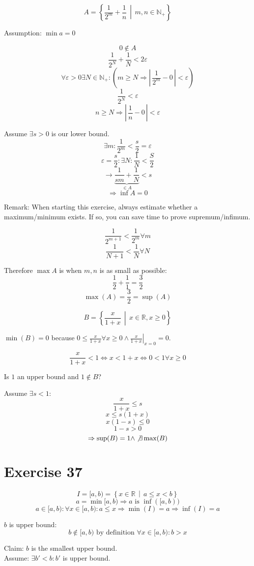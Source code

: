 \documentclass[a4paper]{article}
\theoremstyle{definition}
\newcommand\setdef[2]{\left\{#1\,\middle|\,#2\right\}}
\newcommand\card[1]{\left|\,#1\,\right|}
\begin{document}
\[ A = \setdef{\frac{1}{2^m} + \frac{1}{n}}{m,n \in \mathbb N_+} \]

Assumption: $\min{a} = 0$

\[ 0 \not\in A \]
\[ \frac{1}{2^N} + \frac{1}{N} < 2\varepsilon \]
\[ \forall \varepsilon > 0 \exists N \in \mathbb N_+: (m \geq N \Rightarrow \card{\frac{1}{2^m} - 0} < \varepsilon) \]
\[ \frac{1}{2^N} < \varepsilon \]
\[ n \geq N \Rightarrow \card{\frac1n - 0} < \varepsilon \]

Assume $\exists s > 0$ is our lower bound.
\[ \exists m: \frac{1}{2^m} < \frac{s}{2} = \varepsilon \]
\[ \varepsilon = \frac{s}{2}: \exists N: \frac{1}{N} < \frac{S}{2} \]
\[ \rightarrow \underbrace{\frac{1}{sm} + \frac{1}{N}}_{\in A} < s \]
\[ \Rightarrow \inf{A} = 0 \]

Remark: When starting this exercise, always estimate whether a maximum/minimum exists.
If so, you can save time to prove supremum/infimum.

\[ \frac{1}{2^{m+1}} < \frac{1}{2^m} \forall m \]
\[ \frac{1}{N+1} < \frac{1}{N} \forall N \]

Therefore $\max{A}$ is when $m,n$ is as small as possible:
\[ \frac12 + \frac11 = \frac32 \]
\[ \max(A) = \frac32 = \sup(A) \]

\[ B = \setdef{\frac{x}{1+x}}{x \in \mathbb R, x \geq 0} \]

$\min(B) = 0$ because $0 \leq \frac{x}{1 + x} \forall x \geq 0 \land \left.\frac{x}{1+x} \right|_{x = 0} = 0$.

\[ \frac{x}{1+x} < 1 \Leftrightarrow x < 1 + x \Leftrightarrow 0 < 1 \forall x \geq 0 \]

Is $1$ an upper bound and $1 \not\in B$?

Assume $\exists s < 1$:
\[ \frac{x}{1 + x} \leq s \]
\[ x \leq s(1 + x) \]
\[ x(1-s) \leq 0 \]
\[ 1 - s > 0 \]
\[ \Rightarrow \sup(B) = 1 \land \not\exists \max(B) \]

\section{Exercise 37}

\[ I = [a, b) = \setdef{x \in \mathbb R}{a \leq x < b} \]
\[ a = \min{[a,b)} \Rightarrow a \text{ is } \inf([a, b)) \]
\[ a \in [a,b): \forall x \in [a,b): a \leq x \Rightarrow \min(I) = a \Rightarrow \inf(I) = a \]

$b$ is upper bound:
\[ b \not\in [a,b) \text{ by definition } \forall x \in [a,b): b > x \]

Claim: $b$ is the smallest upper bound. \\
Assume: $\exists b' < b: b'$ is upper bound.
\end{document}
